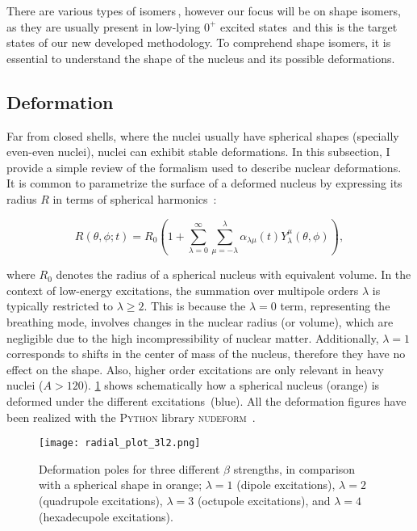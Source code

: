 There are various types of isomers\,\cite{Walker2020,NuclearIsomers}, however our focus will be on shape isomers, as they are usually present in low-lying $0^+$ excited states\,\cite{NuclearIsomers} and this is the target states of our new developed methodology. To comprehend shape isomers, it is essential to understand the shape of the nucleus and its possible deformations.

\subsection{Deformation}\label{subsec:intro:deformation}

Far from closed shells, where the nuclei usually have spherical shapes (specially even-even nuclei), nuclei can exhibit stable deformations. In this subsection, I provide a simple review of the formalism used to describe nuclear deformations.
\newpar
It is common to parametrize the surface of a deformed nucleus by expressing its radius $R$ in terms of spherical harmonics~\cite{RingSchuck1980}:

\begin{equation}
    R\left(\theta, \phi; t\right) = R_0 \left(1+\sum_{\lambda=0}^{\infty}\sum_{\mu=-\lambda}^{\lambda}\alpha_{\lambda\mu}\left(t\right)Y_\lambda^\mu\left(\theta, \phi\right)\right),
\end{equation}

where $R_0$ denotes the radius of a spherical nucleus with equivalent volume. In the context of low-energy excitations, the summation over multipole orders $\lambda$ is typically restricted to $\lambda \geq 2$. This is because the $\lambda = 0$ term, representing the breathing mode, involves changes in the nuclear radius (or volume), which are negligible due to the high incompressibility of nuclear matter. Additionally, $\lambda = 1$ corresponds to shifts in the center of mass of the nucleus, therefore they have no effect on the shape. Also, higher order excitations are only relevant in heavy nuclei ($A>120$). \cref{fig:intro:deformationpoles} shows schematically how a spherical nucleus (orange) is deformed under the different excitations~(blue). All the deformation figures have been realized with the \textsc{Python} library \textsc{nudeform}~\cite{nudeform}. 

\begin{figure}[hbt]
    \centering
    \texttt{[image: radial\_plot\_3l2.png]}
    \caption{Deformation poles for three different $\beta$ strengths, in comparison with a spherical shape in orange; $\lambda=1$ (dipole excitations), $\lambda=2$ (quadrupole excitations), $\lambda=3$ (octupole excitations), and $\lambda=4$ (hexadecupole excitations).}
    \label{fig:intro:deformationpoles}
\end{figure}

